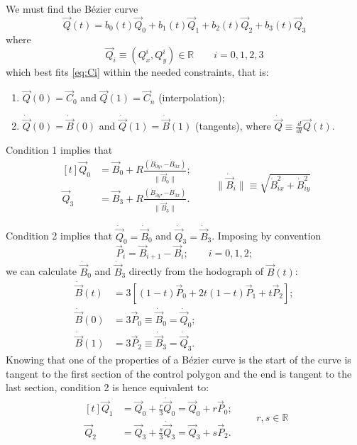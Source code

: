 \documentclass{scrartcl}
\newcommand\V[1]{\vec{#1}}
\newcommand\D[1]{\dot{#1}}
\newcommand\DV[1]{\D{\V{#1}}}
\begin{document}
We must find the Bézier curve
\begin{equation}\label{eq:q}
\V{Q}(t) = b_0(t) \V{Q}_0 + b_1(t) \V{Q}_1 + b_2(t) \V{Q}_2 + b_3(t) \V{Q}_3
\end{equation}
where
\begin{equation*}
\V{Q}_i \equiv ( Q^i_x, Q^i_y ) \in \mathbb{R} \qquad i = 0,1,2,3
\end{equation*}
which best fits \eqref{eq:Ci} within the needed constraints, that is:
\begin{enumerate}
\item $\V{Q}(0) = \V{C}_0$ and $\V{Q}(1) = \V{C}_n$ (interpolation);
\item $\DV{Q}(0) = \DV{B}(0)$ and $\DV{Q}(1) = \DV{B}(1)$ (tangents),
where $\DV{Q} \equiv \frac{d}{dt} \V{Q}(t)$.
\end{enumerate}

\medskip
Condition 1 implies that
\begin{equation}\label{eq:q03}
\begin{aligned}[t]
    \V{Q}_0 &= \V{B}_0 + R \frac{(\D{B}_{0y}, -\D{B}_{0x})}
	{\| \DV{B}_0 \|};\\
    \V{Q}_3 &= \V{B}_3 + R \frac{(\D{B}_{3y}, -\D{B}_{3x})}
	{\| \DV{B}_3 \|}.
\end{aligned}
\qquad\| \DV{B}_i \| \equiv \sqrt{\D{B}_{ix}^2 + \D{B}_{iy}^2}
\end{equation}

Condition 2 implies that $\DV{Q}_0 = \DV{B}_0$ and
$\DV{Q}_3 = \DV{B}_3$. Imposing by convention
\begin{equation}\label{eq:pi}
    \V{P}_i = \V{B}_{i+1} - \V{B}_i; \qquad i = 0, 1, 2;
\end{equation}
we can calculate $\DV{B}_0$ and $\DV{B}_3$ directly from the hodograph
of $\V{B}(t)$:
\begin{align*}
    \DV{B}(t) &= 3 \left[ (1-t) \V{P}_0 + 2t(1-t) \V{P}_1 + t \V{P}_2 \right]; \\
    \DV{B}(0) &= 3 \V{P}_0 \equiv \DV{B}_0 = \DV{Q}_0; \\
    \DV{B}(1) &= 3 \V{P}_2 \equiv \DV{B}_3 = \DV{Q}_3.
\end{align*}
Knowing that one of the properties of a Bézier curve is the start of the
curve is tangent to the first section of the control polygon and the end
is tangent to the last section, condition 2 is hence equivalent to:
\begin{equation}\label{eq:q12}
\begin{aligned}[t]
    \V{Q}_1 &= \V{Q}_0 + \frac{r}{3} \DV{Q}_0 = \V{Q}_0 + r \V{P}_0; \\
    \V{Q}_2 &= \V{Q}_3 + \frac{s}{3} \DV{Q}_3 = \V{Q}_3 + s \V{P}_2.
\end{aligned}
\qquad r, s \in \mathbb{R}
\end{equation}
\end{document}
